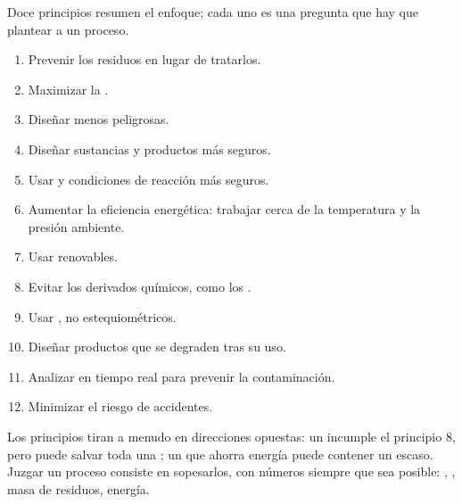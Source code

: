 Doce principios resumen el enfoque; cada uno es una pregunta que hay que
plantear a un proceso.
\begin{enumerate}
  \item Prevenir los residuos en lugar de tratarlos.
  \item Maximizar la .
  \item Diseñar  menos peligrosas.
  \item Diseñar sustancias y productos más seguros.
  \item Usar  y condiciones de reacción más seguros.
  \item Aumentar la eficiencia energética: trabajar cerca de la
        temperatura y la presión ambiente.
  \item Usar  renovables.
  \item Evitar los derivados químicos, como los .
  \item Usar , no  estequiométricos.
  \item Diseñar productos que se degraden tras su uso.
  \item Analizar en tiempo real para prevenir la contaminación.
  \item Minimizar el riesgo de accidentes.
\end{enumerate}

\begin{remark}\label{rem:g12:synthesis-strategy:principles}
Los principios tiran a menudo en direcciones opuestas: un 
incumple el principio 8, pero puede salvar toda una ; un
 que ahorra energía puede contener un  escaso. Juzgar un
proceso consiste en sopesarlos, con números siempre que sea posible:
, , masa de residuos, energía.
\end{remark}

